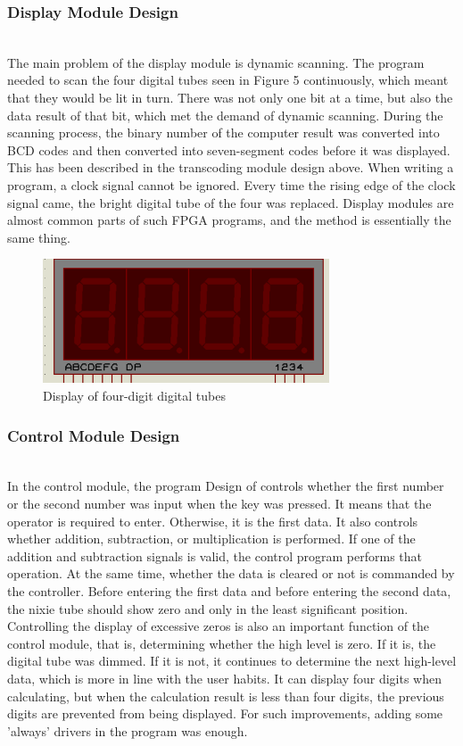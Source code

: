 \documentclass[11pt,journal,compsoc]{IEEEtran}
\begin{document}
\subsubsection{Display Module Design}
\hfill\\
The main problem of the display module is dynamic scanning. The program needed to scan the four digital tubes seen in Figure 5 continuously, which meant that they would be lit in turn. There was not only one bit at a time, but also the data result of that bit, which met the demand of dynamic scanning. During the scanning process, the binary number of the computer result was converted into BCD codes and then converted into seven-segment codes before it was displayed. This has been described in the transcoding module design above. When writing a program, a clock signal cannot be ignored. Every time the rising edge of the clock signal came, the bright digital tube of the four was replaced. Display modules are almost common parts of such FPGA programs, and the method is essentially the same thing.
\begin{figure}[H]
	\centering
	\includegraphics[width=8.5cm]{fig6}
	\caption{Display of four-digit digital tubes}
	\label{Fig6}
\end{figure}

\subsubsection{Control Module Design}
\hfill\\
In the control module, the program Design of controls whether the first number or the second number was input when the key was pressed. It means that the operator is required to enter. Otherwise, it is the first data. It also controls whether addition, subtraction, or multiplication is performed. If one of the addition and subtraction signals is valid, the control program performs that operation. At the same time, whether the data is cleared or not is commanded by the controller. Before entering the first data and before entering the second data, the nixie tube should show zero and only in the least significant position. Controlling the display of excessive zeros is also an important function of the control module, that is, determining whether the high level is zero. If it is, the digital tube was dimmed. If it is not, it continues to determine the next high-level data, which is more in line with the user habits. It can display four digits when calculating, but when the calculation result is less than four digits, the previous digits are prevented from being displayed. For such improvements, adding some 'always' drivers in the program was enough.
\end{document}
